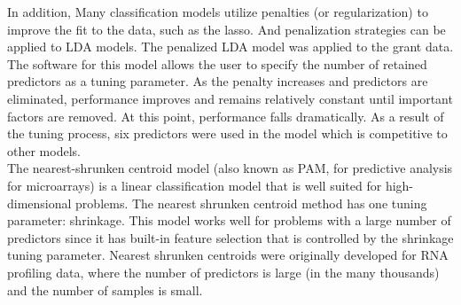 \documentclass{article}%
\begin{document}
\indent In addition, Many classification models utilize penalties (or regularization) to improve the fit to the data, such as the lasso. And penalization strategies can be applied to LDA models. The penalized LDA model was applied to the grant data. The software for this model allows the user to specify the number of retained predictors as a tuning parameter. As the penalty increases and predictors are eliminated, performance improves and remains relatively constant until
important factors are removed. At this point, performance falls dramatically. As a result of the tuning process, six predictors were used in the model which is competitive to other models.\\
\indent The nearest-shrunken centroid model (also known as PAM, for predictive analysis for microarrays) is a linear classification model that is well suited for high-dimensional problems. The nearest shrunken centroid method has one tuning parameter: shrinkage. This model works well for problems with a large number of predictors since it has built-in feature selection that is controlled by the shrinkage tuning parameter. Nearest shrunken centroids were originally developed for RNA profiling data, where the number of predictors is large (in the many thousands) and the number of samples is small.

%
\end{document}
